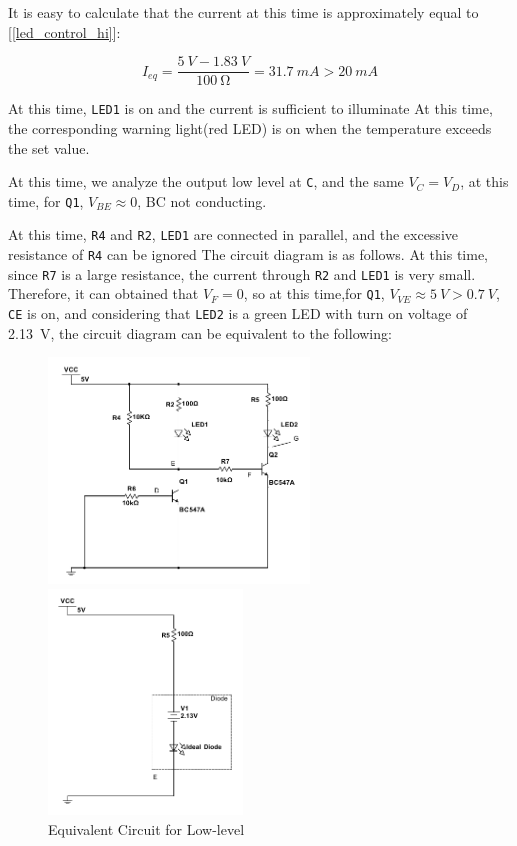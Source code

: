 \documentclass[12pt]{article}
\numberwithin{equation}{section}
\begin{document}
It is easy to calculate that the current at this time is approximately equal to [\ref{led_control_hi}]:


\begin{equation}
	I_{eq}=\frac{\qty{5}{V} -\qty{1.83}{V}}{\qty{100}{\ohm}}=\qty{31.7}{mA}>\qty{20}{mA} \label{led_control_hi}
\end{equation}


At this time, \verb|LED1| is on and the current is sufficient to illuminate At this time, the corresponding warning light(red LED) is on when the temperature exceeds the set value.


At this time, we analyze the output low level at \verb|C|, and the same $V_C=V_D$, at this time, for \verb|Q1|, $V_{BE} \approx 0 $, BC not conducting.


At this time, \verb|R4| and \verb|R2|, \verb|LED1| are connected in parallel, and the excessive resistance of \verb|R4| can be ignored The circuit diagram is as follows. At this time, since \verb|R7| is a large resistance, the current through \verb|R2| and \verb|LED1| is very small. Therefore, it can obtained that $V_F =0$, so at this time,for \verb|Q1|, $V_{VE} \approx \qty{5}{V} >\qty{0.7}{V}$, \verb}CE} is on, and considering that \verb|LED2| is a green LED with turn on voltage of \qty{2.13}{V}, the circuit diagram can be equivalent to the following:


\begin{figure}[H]
\centering
\begin{minipage}[t]{0.48\textwidth}
\centering
\includegraphics[height=6cm]{LED_control_module_lo_1}

\caption{$V_D=0V$}
\end{minipage}
\begin{minipage}[t]{0.48\textwidth}
\centering
\includegraphics[height=6cm]{LED_control_module_lo_2}
\caption{Equivalent Circuit for Low-level}
\end{minipage}
\end{figure}
\end{document}
